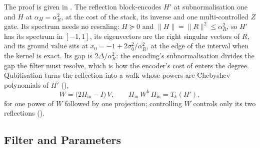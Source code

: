 The proof is given in . The reflection block-encodes $H'$ at subnormalisation one and $H$ at $\alpha_H=\alpha_R^2$, at the cost of the stack, its inverse and one multi-controlled $Z$ gate. Its spectrum needs no rescaling: $H\succeq0$ and $\|H\|=\|R\|^2\le\alpha_R^2$, so $H'$ has its spectrum in $[-1,1]$, its eigenvectors are the right singular vectors of $R$, and its ground value sits at $x_0=-1+2\sigma_0^2/\alpha_R^2$, at the edge of the interval when the kernel is exact. Its gap is $2\Delta/\alpha_R^2$: the encoding's subnormalisation divides the gap the filter must resolve, which is how the encoder's cost of  enters the degree. Qubitisation \cite{lowchuang2019qubitization} turns the reflection into a walk whose powers are Chebyshev polynomials of $H'$ (),
\begin{equation}
    W=\bigl(2\Pi_{\mathrm{in}}-I\bigr)\,V,
    \qquad
    \Pi_{\mathrm{in}}\,W^{k}\,\Pi_{\mathrm{in}}=T_k(H') ,
    \label{eq:walk}
\end{equation}
for one power of $W$ followed by one projection; controlling $W$ controls only its two reflections ().

\subsection{Filter and Parameters}
\label{sec:pipeline-filter}

